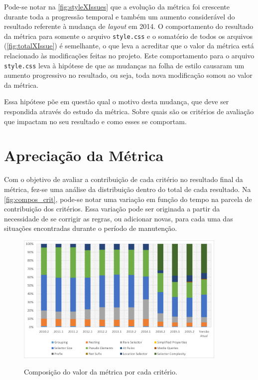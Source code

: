 Pode-se notar na \autoref{fig:styleXIssues} que a evolução da métrica foi crescente durante toda a progressão temporal e também um aumento considerável do resultado referente à mudança de \textit{layout} em 2014.
O comportamento do resultado da métrica para somente o arquivo \texttt{style.css} e o somatório de todos os arquivos (\autoref{fig:totalXIssue}) é semelhante, o que leva a acreditar que o valor da métrica está relacionado às modificações feitas no projeto. Este comportamento para o arquivo \texttt{style.css} leva à hipótese de que as mudanças na folha de estilo causaram um aumento progressivo no resultado, ou seja, toda nova modificação somou ao valor da métrica.

Essa hipótese põe em questão qual o motivo desta mudança, que deve ser respondida através do estudo da métrica. Sobre quais são os critérios de avaliação que impactam no seu resultado e como esses se comportam. 

\section{Apreciação da Métrica}

Com o objetivo de avaliar a contribuição de cada critério no resultado final da métrica, fez-se uma análise da distribuição dentro do total de cada resultado. Na \autoref{fig:compos_crit}, pode-se notar uma variação em função do tempo na parcela de contribuição dos critérios. Essa variação pode ser originada a partir da necessidade de se corrigir as regras, ou adicionar novas, para cada uma das situações encontradas durante o período de manutenção.


\begin{figure}[!htb]
	\centering
	\caption{Composição do valor da métrica por cada critério.}
	\includegraphics[width=0.9\textwidth]{./04-figuras/composition_criteria}
	\label{fig:compos_crit}
\end{figure}

